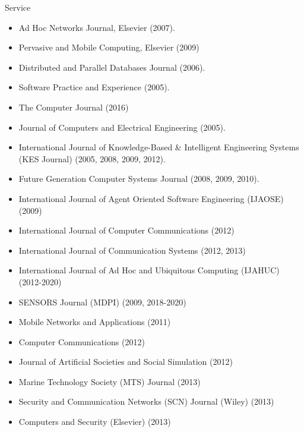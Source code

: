 \begin{category}{Service}
\begin{itemize}
\item Ad Hoc Networks Journal, Elsevier (2007).

\item Pervasive and Mobile Computing, Elsevier (2009)

\item Distributed and Parallel Databases Journal (2006).

\item Software Practice and Experience (2005).

\item The Computer Journal (2016)

\item Journal of Computers and Electrical Engineering (2005).

\item International Journal of Knowledge-Based \& Intelligent Engineering Systems (KES Journal) (2005, 2008, 2009, 2012).

\item Future Generation Computer Systems Journal (2008, 2009, 2010).

\item International Journal of Agent Oriented Software Engineering (IJAOSE) (2009)

\item International Journal of Computer Communications (2012)

\item International Journal of Communication Systems (2012, 2013)

\item International Journal of Ad Hoc and Ubiquitous Computing (IJAHUC) (2012-2020)

\item SENSORS Journal (MDPI) (2009, 2018-2020)

\item Mobile Networks and Applications (2011)

\item Computer Communications (2012)

\item Journal of Artificial Societies and Social Simulation (2012)

\item Marine Technology Society (MTS) Journal (2013)

\item Security and Communication Networks (SCN) Journal (Wiley) (2013)

\item Computers and Security (Elsevier) (2013)


\end{itemize}
\end{category}
